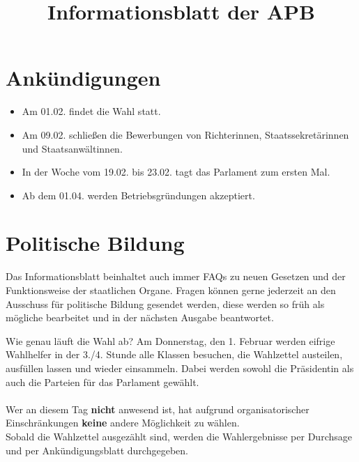 \documentclass{sasbase}
\begin{document}
\title{Informationsblatt der APB}

\setcounter{secnumdepth}{5}

\mytitle

\parensstyle

\section{Ankündigungen}
\begin{itemize}
    \item Am 01.02. findet die Wahl statt.
    \item Am 09.02. schließen die Bewerbungen von Richterinnen, Staatssekretärinnen und Staatsanwältinnen.
    \item In der Woche vom 19.02. bis 23.02. tagt das Parlament zum ersten Mal.
    \item Ab dem 01.04. werden Betriebsgründungen akzeptiert.
\end{itemize}
\section{Politische Bildung}
Das Informationsblatt beinhaltet auch immer FAQs zu neuen Gesetzen und der Funktionsweise der staatlichen Organe.
Fragen k\"{o}nnen gerne jederzeit an den Ausschuss f\"{u}r politische Bildung gesendet werden, diese werden so fr\"{u}h als m\"{o}gliche bearbeitet und in der n\"{a}chsten Ausgabe beantwortet.


\begin{question}{Wie genau läuft die Wahl ab?}
    Am Donnerstag, den 1. Februar werden eifrige Wahlhelfer in der 3./4. Stunde alle Klassen besuchen, die Wahlzettel austeilen,
    ausfüllen lassen und wieder einsammeln. Dabei werden sowohl die Präsidentin als auch die
    Parteien für das Parlament gewählt.
    \\\\
    \noindent Wer an diesem Tag \textbf{nicht} anwesend ist, hat aufgrund organisatorischer Einschränkungen \textbf{keine} andere Möglichkeit zu wählen.
    \\
    
    \noindent Sobald die Wahlzettel ausgezählt sind, werden die Wahlergebnisse per Durchsage und per
    Ankündigungsblatt durchgegeben.
\end{question}

\newpage
\end{document}
